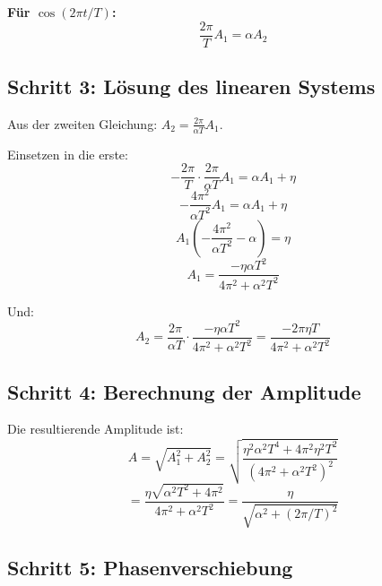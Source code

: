 \documentclass[a4paper,11pt]{report}
\theoremstyle{definition}
\begin{document}
\textbf{Für $\cos(2\pi t / T)$:}
\begin{equation}
    \frac{2\pi}{T} A_1 = \alpha A_2
\end{equation}

\subsection{Schritt 3: Lösung des linearen Systems}

Aus der zweiten Gleichung: $A_2 = \frac{2\pi}{\alpha T} A_1$.

Einsetzen in die erste:
\begin{equation}
    -\frac{2\pi}{T} \cdot \frac{2\pi}{\alpha T} A_1 = \alpha A_1 + \eta
\end{equation}
\begin{equation}
    -\frac{4\pi^2}{\alpha T^2} A_1 = \alpha A_1 + \eta
\end{equation}
\begin{equation}
    A_1 \left(-\frac{4\pi^2}{\alpha T^2} - \alpha\right) = \eta
\end{equation}
\begin{equation}
    A_1 = \frac{-\eta \alpha T^2}{4\pi^2 + \alpha^2 T^2}
\end{equation}

Und:
\begin{equation}
    A_2 = \frac{2\pi}{\alpha T} \cdot \frac{-\eta \alpha T^2}{4\pi^2 + \alpha^2 T^2} = \frac{-2\pi \eta T}{4\pi^2 + \alpha^2 T^2}
\end{equation}

\subsection{Schritt 4: Berechnung der Amplitude}

Die resultierende Amplitude ist:
\begin{equation}
    A = \sqrt{A_1^2 + A_2^2} = \sqrt{\frac{\eta^2 \alpha^2 T^4 + 4\pi^2 \eta^2 T^2}{(4\pi^2 + \alpha^2 T^2)^2}}
\end{equation}
\begin{equation}
    = \frac{\eta\sqrt{\alpha^2 T^2 + 4\pi^2}}{4\pi^2 + \alpha^2 T^2} = \frac{\eta}{\sqrt{\alpha^2 + (2\pi/T)^2}}
\end{equation}

\subsection{Schritt 5: Phasenverschiebung}
\end{document}

